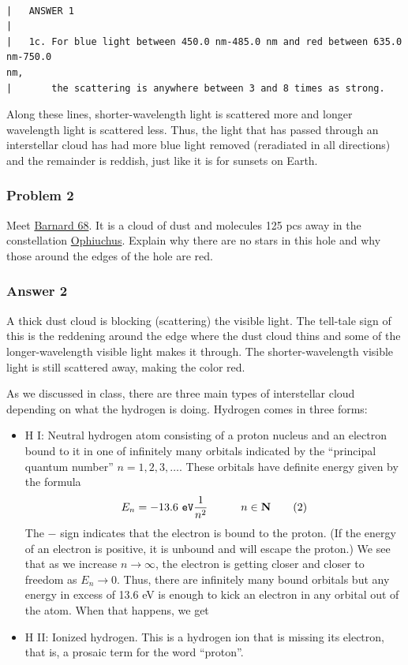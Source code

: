 \documentclass[11pt]{article}
\begin{document}
    \begin{Verbatim}[commandchars=\\\{\}]

|   ANSWER 1
|
|   1c. For blue light between 450.0 nm-485.0 nm and red between 635.0 nm-750.0
nm,
|       the scattering is anywhere between 3 and 8 times as strong.

    \end{Verbatim}

    Along these lines, shorter-wavelength light is scattered more and longer
wavelength light is scattered less. Thus, the light that has passed
through an interstellar cloud has had more blue light removed
(reradiated in all directions) and the remainder is reddish, just like
it is for sunsets on Earth.

 
\subsubsection{Problem 2}\label{problem-2}

Meet \href{https://en.wikipedia.org/wiki/Barnard_68}{Barnard 68}. It is
a cloud of dust and molecules 125 pcs away in the constellation
\href{https://en.wikipedia.org/wiki/Ophiuchus}{Ophiuchus}. Explain why
there are no stars in this hole and why those around the edges of the
hole are red.
 

     
\subsubsection{Answer 2}\label{answer-2}

A thick dust cloud is blocking (scattering) the visible light. The
tell-tale sign of this is the reddening around the edge where the dust
cloud thins and some of the longer-wavelength visible light makes it
through. The shorter-wavelength visible light is still scattered away,
making the color red.
 

    As we discussed in class, there are three main types of interstellar
cloud depending on what the hydrogen is doing. Hydrogen comes in three
forms:

\begin{itemize}
\item
  H I: Neutral hydrogen atom consisting of a proton nucleus and an
  electron bound to it in one of infinitely many orbitals indicated by
  the ``principal quantum number'' \(n=1, 2, 3, \dots\). These orbitals
  have definite energy given by the formula \[
    E_n = -13.6\ \texttt{eV} \frac 1{n^2}\quad \quad \quad n\in {\bf N} \tag{2}
  \] The \(-\) sign indicates that the electron is bound to the proton.
  (If the energy of an electron is positive, it is unbound and will
  escape the proton.) We see that as we increase \(n\to \infty\), the
  electron is getting closer and closer to freedom as \(E_n\to 0\).
  Thus, there are infinitely many bound orbitals but any energy in
  excess of 13.6 eV is enough to kick an electron in any orbital out of
  the atom. When that happens, we get
\item
  H II: Ionized hydrogen. This is a hydrogen ion that is missing its
  electron, that is, a prosaic term for the word ``proton''.
\end{itemize}
\end{document}
